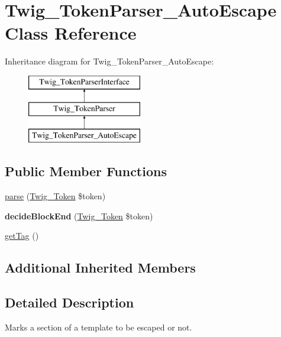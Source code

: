 \hypertarget{class_twig___token_parser___auto_escape}{}\section{Twig\+\_\+\+Token\+Parser\+\_\+\+Auto\+Escape Class Reference}
\label{class_twig___token_parser___auto_escape}
Inheritance diagram for Twig\+\_\+\+Token\+Parser\+\_\+\+Auto\+Escape\+:\begin{figure}[H]
\begin{center}
\leavevmode
\includegraphics[height=3.000000cm]{class_twig___token_parser___auto_escape}
\end{center}
\end{figure}
\subsection*{Public Member Functions}
\begin{DoxyCompactItemize}
\item 
\hyperlink{class_twig___token_parser___auto_escape_a5dfa2e269321584fb74e8b43dabe0efd}{parse} (\hyperlink{class_twig___token}{Twig\+\_\+\+Token} \$token)
\item 
\hypertarget{class_twig___token_parser___auto_escape_aa976dc013d35c2813752149bacd88902}{}{\bfseries decide\+Block\+End} (\hyperlink{class_twig___token}{Twig\+\_\+\+Token} \$token)\label{class_twig___token_parser___auto_escape_aa976dc013d35c2813752149bacd88902}

\item 
\hyperlink{class_twig___token_parser___auto_escape_ab86ba36154b20e6bbfa3ba705f12f9d6}{get\+Tag} ()
\end{DoxyCompactItemize}
\subsection*{Additional Inherited Members}


\subsection{Detailed Description}
Marks a section of a template to be escaped or not.


